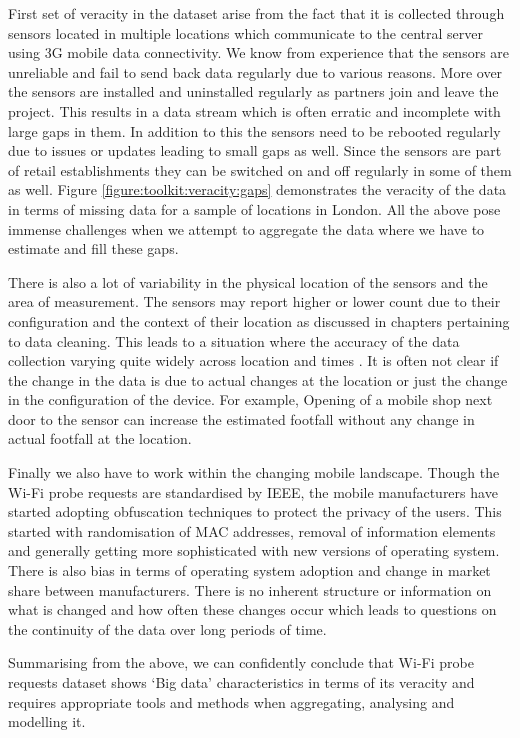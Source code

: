 First set of veracity in the dataset arise from the fact that it is collected through sensors located in multiple locations which communicate to the central server using 3G mobile data connectivity.
We know from experience that the sensors are unreliable and fail to send back data regularly due to various reasons.
More over the sensors are installed and uninstalled regularly as partners join and leave the project.
This results in a data stream which is often erratic and incomplete with large gaps in them.
In addition to this the sensors need to be rebooted regularly due to issues or updates leading to small gaps as well.
Since the sensors are part of retail establishments they can be switched on and off regularly in some of them as well.
Figure \ref{figure:toolkit:veracity:gaps} demonstrates the veracity of the data in terms of missing data for a sample of locations in London.
All the above pose immense challenges when we attempt to aggregate the data where we have to estimate and fill these gaps.

There is also a lot of variability in the physical location of the sensors and the area of measurement.
The sensors may report higher or lower count due to their configuration and the context of their location as discussed in chapters pertaining to data cleaning.
This leads to a situation where the accuracy of the data collection varying quite widely across location and times \cite{lugomer2017}.
It is often not clear if the change in the data is due to actual changes at the location or just the change in the configuration of the device.
For example, Opening of a mobile shop next door to the sensor can increase the estimated footfall without any change in actual footfall at the location.

Finally we also have to work within the changing mobile landscape.
Though the Wi-Fi probe requests are standardised by IEEE, the mobile manufacturers have started adopting obfuscation techniques to protect the privacy of the users.
This started with randomisation of MAC addresses, removal of information elements and generally getting more sophisticated with new versions of operating system.
There is also bias in terms of operating system adoption and change in market share between manufacturers.
There is no inherent structure or information on what is changed and how often these changes occur which leads to questions on the continuity of the data over long periods of time.

Summarising from the above, we can confidently conclude that Wi-Fi probe requests dataset shows `Big data' characteristics in terms of its veracity and requires appropriate tools and methods when aggregating, analysing and modelling it.

